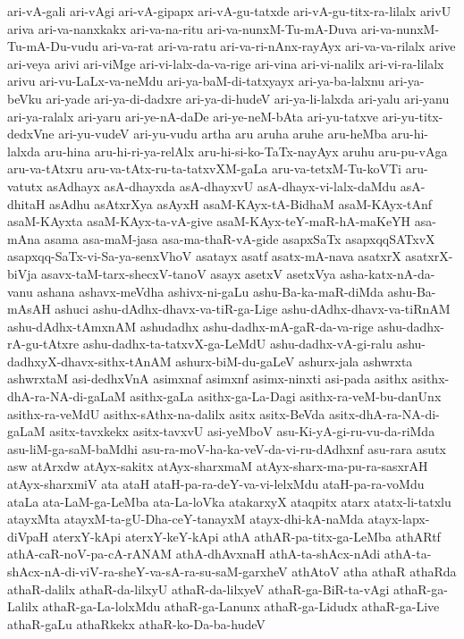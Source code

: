 {ari-vA-gali
ari-vAgi
ari-vA-gipapx
ari-vA-gu-tatxde
ari-vA-gu-titx-ra-lilalx
arivU
ariva
ari-va-nanxkakx
ari-va-na-ritu
ari-va-nunxM-Tu-mA-Duva
ari-va-nunxM-Tu-mA-Du-vudu
ari-va-rat
ari-va-ratu
ari-va-ri-nAnx-rayAyx
ari-va-va-rilalx
arive
ari-veya
arivi
ari-viMge
ari-vi-lalx-da-va-rige
ari-vina
ari-vi-nalilx
ari-vi-ra-lilalx
arivu
ari-vu-LaLx-va-neMdu
ari-ya-baM-di-tatxyayx
ari-ya-ba-lalxnu
ari-ya-beVku
ari-yade
ari-ya-di-dadxre
ari-ya-di-hudeV
ari-ya-li-lalxda
ari-yalu
ari-yanu
ari-ya-ralalx
ari-yaru
ari-ye-nA-daDe
ari-ye-neM-bAta
ari-yu-tatxve
ari-yu-titx-dedxVne
ari-yu-vudeV
ari-yu-vudu
artha
aru
aruha
aruhe
aru-heMba
aru-hi-lalxda
aru-hina
aru-hi-ri-ya-relAlx
aru-hi-si-ko-TaTx-nayAyx
aruhu
aru-pu-vAga
aru-va-tAtxru
aru-va-tAtx-ru-ta-tatxvXM-gaLa
aru-va-tetxM-Tu-koVTi
aru-vatutx
asAdhayx
asA-dhayxda
asA-dhayxvU
asA-dhayx-vi-lalx-daMdu
asA-dhitaH
asAdhu
asAtxrXya
asAyxH
asaM-KAyx-tA-BidhaM
asaM-KAyx-tAnf
asaM-KAyxta
asaM-KAyx-ta-vA-give
asaM-KAyx-teY-maR-hA-maKeYH
asa-mAna
asama
asa-maM-jasa
asa-ma-thaR-vA-gide
asapxSaTx
asapxqqSATxvX
asapxqq-SaTx-vi-Sa-ya-senxVhoV
asatayx
asatf
asatx-mA-nava
asatxrX
asatxrX-biVja
asavx-taM-tarx-shecxV-tanoV
asayx
asetxV
asetxVya
asha-katx-nA-da-vanu
ashana
ashavx-meVdha
ashivx-ni-gaLu
ashu-Ba-ka-maR-diMda
ashu-Ba-mAsAH
ashuci
ashu-dAdhx-dhavx-va-tiR-ga-Lige
ashu-dAdhx-dhavx-va-tiRnAM
ashu-dAdhx-tAmxnAM
ashudadhx
ashu-dadhx-mA-gaR-da-va-rige
ashu-dadhx-rA-gu-tAtxre
ashu-dadhx-ta-tatxvX-ga-LeMdU
ashu-dadhx-vA-gi-ralu
ashu-dadhxyX-dhavx-sithx-tAnAM
ashurx-biM-du-gaLeV
ashurx-jala
ashwrxta
ashwrxtaM
asi-dedhxVnA
asimxnaf
asimxnf
asimx-ninxti
asi-pada
asithx
asithx-dhA-ra-NA-di-gaLaM
asithx-gaLa
asithx-ga-La-Dagi
asithx-ra-veM-bu-danUnx
asithx-ra-veMdU
asithx-sAthx-na-dalilx
asitx
asitx-BeVda
asitx-dhA-ra-NA-di-gaLaM
asitx-tavxkekx
asitx-tavxvU
asi-yeMboV
asu-Ki-yA-gi-ru-vu-da-riMda
asu-liM-ga-saM-baMdhi
asu-ra-moV-ha-ka-veV-da-vi-ru-dAdhxnf
asu-rara
asutx
asw
atArxdw
atAyx-sakitx
atAyx-sharxmaM
atAyx-sharx-ma-pu-ra-sasxrAH
atAyx-sharxmiV
ata
ataH
ataH-pa-ra-deY-va-vi-lelxMdu
ataH-pa-ra-voMdu
ataLa
ata-LaM-ga-LeMba
ata-La-loVka
atakarxyX
ataqpitx
atarx
atatx-li-tatxlu
atayxMta
atayxM-ta-gU-Dha-ceY-tanayxM
atayx-dhi-kA-naMda
atayx-lapx-diVpaH
aterxY-kApi
aterxY-keY-kApi
athA
athAR-pa-titx-ga-LeMba
athARtf
athA-caR-noV-pa-cA-rANAM
athA-dhAvxnaH
athA-ta-shAcx-nAdi
athA-ta-shAcx-nA-di-viV-ra-sheY-va-sA-ra-su-saM-garxheV
athAtoV
atha
athaR
athaRda
athaR-dalilx
athaR-da-lilxyU
athaR-da-lilxyeV
athaR-ga-BiR-ta-vAgi
athaR-ga-Lalilx
athaR-ga-La-lolxMdu
athaR-ga-Lanunx
athaR-ga-Lidudx
athaR-ga-Live
athaR-gaLu
athaRkekx
athaR-ko-Da-ba-hudeV
}
